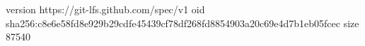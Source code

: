 version https://git-lfs.github.com/spec/v1
oid sha256:c8e6e58fd8e929b29cdfe45439cf78df268fd8854903a20c69e4d7b1eb05fcec
size 87540
